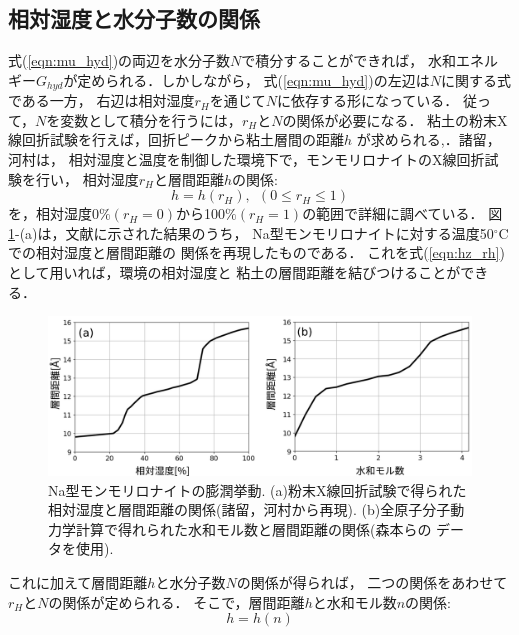 \subsection{相対湿度と水分子数の関係}
式(\ref{eqn:mu_hyd})の両辺を水分子数\(N\)で積分することができれば，
水和エネルギー\(G_{hyd}\)が定められる．しかしながら，
式(\ref{eqn:mu_hyd})の左辺は\(N\)に関する式である一方，
右辺は相対湿度\(r_H\)を通じて\(N\)に依存する形になっている．
従って，$N$を変数として積分を行うには，\(r_H\)と\(N\)の関係が必要になる．
粘土の粉末X線回折試験を行えば，回折ピークから粘土層間の距離\(h\)
が求められる\cite{Morodome},\cite{Yamada}．諸留，河村\cite{Morodome}は，
相対湿度と温度を制御した環境下で，モンモリロナイトのX線回折試験を行い，
相対湿度$r_H$と層間距離$h$の関係:
\begin{equation}
	h=h(r_H), \ \ (0 \leq r_H \leq 1)
	\label{eqn:hz_rh}
\end{equation}
を，相対湿度0$\% (r_H=0)$から100$\% (r_H=1)$の範囲で詳細に調べている．
図\ref{fig:fig1}-(a)は，文献\cite{Morodome}に示された結果のうち，
Na型モンモリロナイトに対する温度50\(^\circ\)Cでの相対湿度と層間距離の
関係を再現したものである．
これを式(\ref{eqn:hz_rh})として用いれば，環境の相対湿度と
粘土の層間距離を結びつけることができる．
\begin{figure}[h]
	\begin{center}
	\includegraphics[width=1.0\linewidth]{Figs/fig1.pdf} 
	\end{center}
	\caption{
		Na型モンモリロナイトの膨潤挙動.
		(a)粉末X線回折試験で得られた相対湿度と層間距離の関係(諸留，河村\cite{Morodome}から再現).
		(b)全原子分子動力学計算で得れられた水和モル数と層間距離の関係(森本ら\cite{Morimoto}の
		データを使用). 
	} 
	\label{fig:fig1}
\end{figure}
これに加えて層間距離\(h\)と水分子数\(N\)の関係が得られば，
二つの関係をあわせて\(r_H\)と\(N\)の関係が定められる．
そこで，層間距離$h$と水和モル数\(n\)の関係:
\begin{equation}
	h=h(n)
	\label{eqn:hz_nw}
\end{equation}
